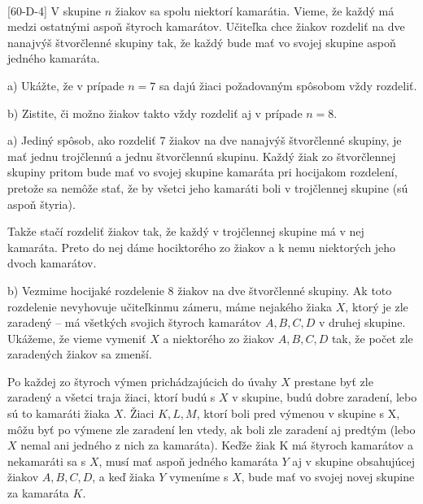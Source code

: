\\
\begin{tcolorbox}[breakable,notitle,boxrule=0pt,colback=light-gray,colframe=light-gray]\ul [60-D-4]
V skupine $n$ žiakov sa spolu niektorí kamarátia. Vieme, že každý má medzi ostatnými aspoň štyroch kamarátov. Učiteľka chce žiakov rozdeliť na dve nanajvýš štvorčlenné skupiny tak, že každý bude mať vo svojej skupine aspoň jedného kamaráta.

a) Ukážte, že v prípade $n = 7$ sa dajú žiaci požadovaným spôsobom vždy rozdeliť.

b) Zistite, či možno žiakov takto vždy rozdeliť aj v prípade $n = 8$.

\end{tcolorbox}

\rieh a) Jediný spôsob, ako rozdeliť 7 žiakov na dve nanajvýš štvorčlenné skupiny, je mať jednu trojčlennú a jednu štvorčlennú skupinu. Každý žiak zo štvorčlennej skupiny pritom bude mať vo svojej skupine kamaráta pri hocijakom rozdelení, pretože sa nemôže stať, že by všetci jeho kamaráti boli v trojčlennej skupine (sú aspoň štyria).

Takže stačí rozdeliť žiakov tak, že každý v trojčlennej skupine má v nej kamaráta. Preto do nej dáme hociktorého zo žiakov a k nemu niektorých jeho dvoch kamarátov.

b) Vezmime hocijaké rozdelenie 8 žiakov na dve štvorčlenné skupiny. Ak toto rozdelenie nevyhovuje učiteľkinmu zámeru, máme nejakého žiaka $X$, ktorý je zle zaradený -- má všetkých svojich štyroch kamarátov $A, B, C, D$ v druhej skupine. Ukážeme, že vieme vymeniť $X$ a niektorého zo žiakov $A, B, C, D$ tak, že počet zle zaradených žiakov sa zmenší.

Po každej zo štyroch výmen prichádzajúcich do úvahy $X$ prestane byť zle zaradený a všetci traja žiaci, ktorí budú s $X$ v skupine, budú dobre zaradení, lebo sú to kamaráti žiaka $X$. Žiaci $K, L, M$, ktorí boli pred výmenou v skupine s X, môžu byť po výmene zle zaradení len vtedy, ak boli zle zaradení aj predtým (lebo $X$ nemal ani jedného z nich za kamaráta). Keďže žiak K má štyroch kamarátov a nekamaráti sa s $X$, musí mať aspoň jedného kamaráta $Y$ aj v skupine obsahujúcej žiakov $A, B, C, D$, a keď žiaka $Y$ vymeníme s $X$, bude mať vo svojej novej skupine za kamaráta $K$.

